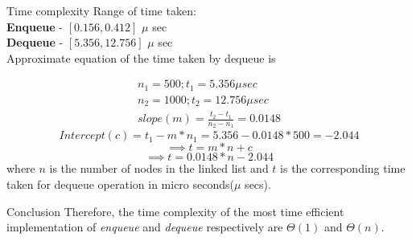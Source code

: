 \documentclass{beamer}
\begin{document}
\begin{frame}{Time complexity}
Range of time taken: 
\\
\textbf{Enqueue} -  $[0.156, 0.412]$ $\mu$ sec
\\
\textbf{Dequeue} - $[5.356, 12.756]$ $\mu$ sec
\\
Approximate equation of the time taken by dequeue is

\begin{align}
    n_{1} = 500; t_{1} = 5.356 \mu sec  
\\
    n_{2} = 1000; t_{2} = 12.756 \mu sec
\\
    slope(m) = \frac{t_{2}-t_{1}}{n_{2}-n_{1}} = 0.0148
\end{align}
\begin{equation}
    Intercept(c) = t_{1} - m*n_{1} = 5.356 - 0.0148*500 = -2.044
\end{equation}
\begin{equation}
    \implies t = m*n + c
\end{equation}
\begin{equation}
    \implies t = 0.0148*n - 2.044
\end{equation}
where $n$ is the number of nodes in the linked list and $t$ is the corresponding time taken for dequeue operation in micro seconds($\mu$ secs).

    
\end{frame}

\begin{frame}{Conclusion}
Therefore, the time complexity of the most time efficient implementation of \emph{enqueue} and \emph{dequeue} respectively are $\Theta(1)$ and $\Theta(n)$.
    
\end{frame}
\end{document}
